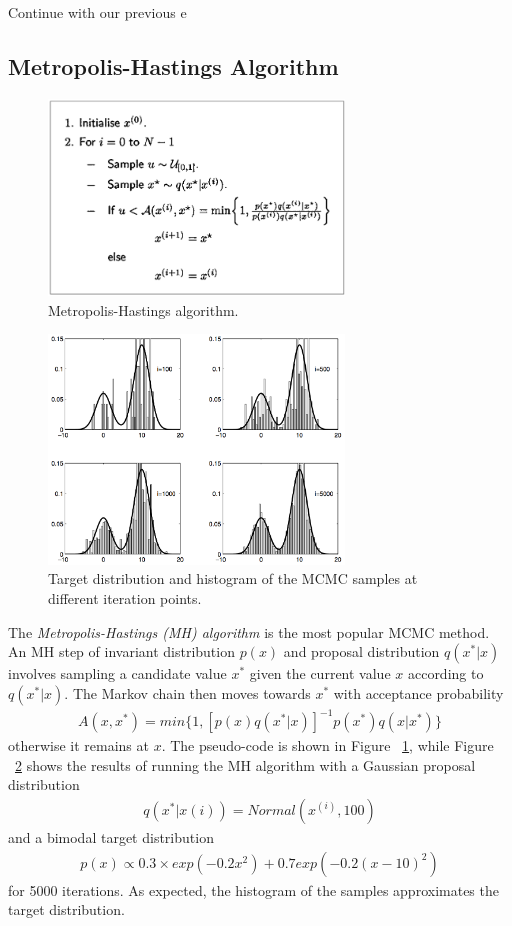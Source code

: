 Continue with our previous e
\subsection{Metropolis-Hastings Algorithm}

\begin{figure}
    \centering
    \includegraphics[width=0.7\textwidth]{figures/mh.png}
    \caption{Metropolis-Hastings algorithm.}
    \label{fig:mh}
\end{figure}

\begin{figure}
    \centering
    \includegraphics[width=0.7\textwidth]{figures/mh2.png}
    \caption{Target distribution and histogram of the MCMC samples at different iteration points.}
    \label{fig:mh2}
\end{figure}

The \textit{Metropolis-Hastings (MH) algorithm} is the most popular MCMC method. An MH step of invariant distribution $p(x)$ and proposal distribution $q(x^*	| x)$ involves sampling a candidate value $x^*$ given the current value $x$ according to $q(x^* | x)$. The Markov chain then moves towards $x^*$ with acceptance probability
\begin{align*}
  A(x, x^*) = min\{1,[p(x)q(x^* | x)]^{−1} p(x^*)q(x | x^*)\}
\end{align*}
otherwise it remains at $x$. The pseudo-code is shown in Figure ~\ref{fig:mh}, while Figure ~\ref{fig:mh2} shows the results of running the MH algorithm with a Gaussian proposal distribution
\begin{align*}
  q(x^* | x(i)) = Normal(x^{(i)}, 100)
\end{align*}
and a bimodal target distribution
\begin{align*}
  p(x) \propto 0.3 \times exp(−0.2x^2) + 0.7 exp(−0.2{(x - 10)}^2)
\end{align*}
for 5000 iterations. As expected, the histogram of the samples approximates the target distribution.

